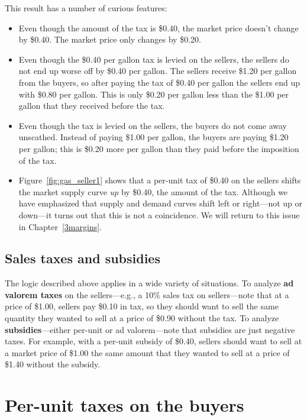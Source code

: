 This result has a number of curious features:
\begin{itemize}
\item Even though the amount of the tax is \$0.40, the market price doesn't change by \$0.40. The market price only changes by \$0.20.
\item Even though the \$0.40 per gallon tax is levied on the sellers, the sellers do not end up worse off by \$0.40 per gallon. The sellers receive \$1.20 per gallon from the buyers, so after paying the tax of \$0.40 per gallon the sellers end up with \$0.80 per gallon. This is only \$0.20 per gallon less than the \$1.00 per gallon that they received before the tax.
\item Even though the tax is levied on the sellers, the buyers do not come away unscathed. Instead of paying \$1.00 per gallon, the buyers are paying \$1.20 per gallon; this is \$0.20 more per gallon than they paid before the imposition of the tax.
\item Figure~\ref{fig:gas_seller1} shows that a per-unit tax of \$0.40 on the sellers shifts the market supply curve \emph{up} by \$0.40, the amount of the tax. Although we have emphasized that supply and demand curves shift left or right---not up or down---it turns out that this is not a coincidence. We will return to this issue in Chapter~\ref{3margins}.
\end{itemize}

\subsection*{Sales taxes and subsidies}

The logic described above applies in a wide variety of situations. To analyze \textbf{ad valorem taxes} on the sellers---e.g., a 10\% sales tax on sellers---note that at a price of \$1.00, sellers pay \$0.10 in tax, so they should want to sell the same quantity they wanted to sell at a price of \$0.90 without the tax. To analyze \textbf{subsidies}---either per-unit or ad valorem---note that subsidies are just negative taxes. For example, with a per-unit subsidy of \$0.40, sellers should want to sell at a market price of \$1.00 the same amount that they wanted to sell at a price of \$1.40 without the subsidy.

\section{Per-unit taxes on the buyers}

